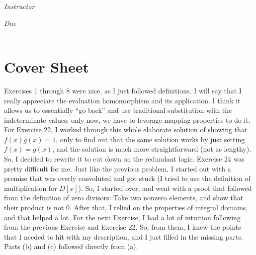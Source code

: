 \documentclass[12pt, oneside]{book}
\begin{document}
\begin{titlepage}
\begin{center}
\begin{large}
            \vspace*{1\baselineskip}

            \textit{Instructor} \\[1ex] %
            \professor

            \vspace*{1\baselineskip}

            \textit{Due}\\[1ex]
            {\scshape  \finaldate} \\[0.3\baselineskip] %

            \thispagestyle{empty}

        \end{large}
    \end{center}
\end{titlepage}




\section*{Cover Sheet}

Exercises 1 through 8 were nice, as I just followed definitions. I will say that I really appreciate the evaluation homomorphism and its application. I think it allows us to essentially ``go back'' and use traditional substitution with the indeterminate values; only now, we have to leverage mapping properties to do it. For Exercise 22, I worked through this whole elaborate solution of showing that \(f(x)g(x) = 1\), only to find out that the same solution works by just setting \(f(x) = g(x)\), and the solution is much more straightforward (not as lengthy). So, I decided to rewrite it to cut down on the redundant logic. Exercise 24 was pretty difficult for me. Just like the previous problem, I started out with a premise that was overly convoluted and got stuck (I tried to use the definition of multiplication for \(D[x]\)). So, I started over, and went with a proof that followed from the definition of zero divisors: Take two nonzero elements, and show that their product is not 0. After that, I relied on the properties of integral domains, and that helped a lot. For the next Exercise, I had a lot of intuition following from the previous Exercise and Exercise 22. So, from them, I knew the points that I needed to hit with my description, and I just filled in the missing parts. Parts (b) and (c) followed directly from (a). \\
\end{document}

